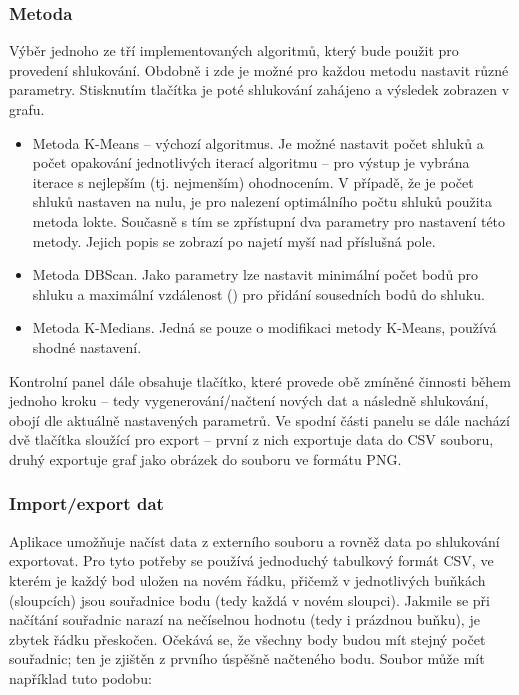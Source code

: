 \documentclass[pdftex,a4paper]{article}
\begin{document}
\subsubsection*{Metoda}
Výběr jednoho ze tří implementovaných algoritmů, který bude použit pro provedení shlukování. Obdobně i zde je možné pro každou metodu nastavit různé parametry. Stisknutím tlačítka je poté shlukování zahájeno a výsledek zobrazen v grafu.

\begin{itemize}
	\item Metoda K-Means -- výchozí algoritmus. Je možné nastavit počet shluků a počet opakování jednotlivých iterací algoritmu -- pro výstup je vybrána iterace s nejlepším (tj. nejmenším) ohodnocením. V případě, že je počet shluků nastaven na nulu, je pro nalezení optimálního počtu shluků použita metoda lokte. Současně s tím se zpřístupní dva parametry pro nastavení této metody. Jejich popis se zobrazí po najetí myší nad příslušná pole.
	
	\item Metoda DBScan. Jako parametry lze nastavit minimální počet bodů pro  shluku a maximální vzdálenost (\textepsilon) pro přidání sousedních bodů do shluku.
	
	\item Metoda K-Medians. Jedná se pouze o modifikaci metody K-Means, používá shodné nastavení.
\end{itemize}

Kontrolní panel dále obsahuje tlačítko, které provede obě zmíněné činnosti během jednoho kroku -- tedy vygenerování/načtení nových dat a následně shlukování, obojí dle aktuálně nastavených parametrů. Ve spodní části panelu se dále nachází dvě tlačítka sloužící pro export -- první z nich exportuje data do CSV souboru, druhý exportuje graf jako obrázek do souboru ve formátu PNG.


\subsubsection*{Import/export dat}
Aplikace umožňuje načíst data z externího souboru a rovněž data po shlukování exportovat. Pro tyto potřeby se používá jednoduchý tabulkový formát CSV, ve kterém je každý bod uložen na novém řádku, přičemž v jednotlivých buňkách (sloupcích) jsou souřadnice bodu (tedy každá  v novém sloupci). Jakmile se při načítání souřadnic narazí na nečíselnou hodnotu (tedy i prázdnou buňku), je zbytek řádku přeskočen. Očekává se, že všechny body budou mít stejný počet souřadnic; ten je zjištěn z prvního úspěšně načteného bodu. Soubor může mít například tuto podobu:
\end{document}
